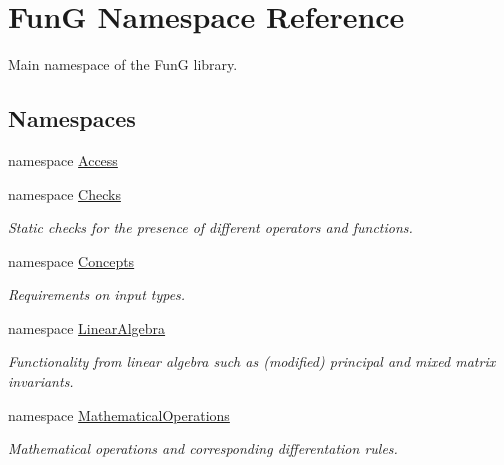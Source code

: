 \hypertarget{namespaceFunG}{\section{\-Fun\-G \-Namespace \-Reference}
\label{namespaceFunG}
}


\-Main namespace of the \-Fun\-G library.  


\subsection*{\-Namespaces}
\begin{DoxyCompactItemize}
\item 
namespace \hyperlink{namespaceFunG_1_1Access}{\-Access}
\item 
namespace \hyperlink{namespaceFunG_1_1Checks}{\-Checks}
\begin{DoxyCompactList}\small\item\em \-Static checks for the presence of different operators and functions. \end{DoxyCompactList}\item 
namespace \hyperlink{namespaceFunG_1_1Concepts}{\-Concepts}
\begin{DoxyCompactList}\small\item\em \-Requirements on input types. \end{DoxyCompactList}\item 
namespace \hyperlink{namespaceFunG_1_1LinearAlgebra}{\-Linear\-Algebra}
\begin{DoxyCompactList}\small\item\em \-Functionality from linear algebra such as (modified) principal and mixed matrix invariants. \end{DoxyCompactList}\item 
namespace \hyperlink{namespaceFunG_1_1MathematicalOperations}{\-Mathematical\-Operations}
\begin{DoxyCompactList}\small\item\em \-Mathematical operations and corresponding differentation rules. \end{DoxyCompactList}\end{DoxyCompactItemize}
